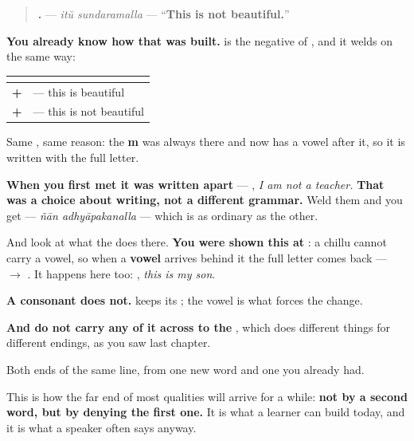 \begin{grammarlens}[title={Grammar Lens: the denial welds too}]
\begin{quote}
\textbf{ .} — \emph{itŭ sundaramalla} — \textquotedblleft{}\textbf{This is not beautiful.}\textquotedblright{}
\end{quote}

\textbf{You already know how that was built.} \textbf{} is the negative of \textbf{}, and it welds on the same way:

\noindent
\begin{tabularx}{\linewidth}{@{}>{\raggedright\arraybackslash}X>{\raggedright\arraybackslash}X@{}}
\toprule
\textbf{} & \textbf{} \\
\midrule
\textbf{\ml{സുന്ദരം} + \ml{ആണ്}} & \textbf{\ml{സുന്ദരമാണ്}} — this is beautiful \\
\textbf{\ml{സുന്ദരം} + \ml{അല്ല}} & \textbf{\ml{സുന്ദരമല്ല}} — this is not beautiful \\
\bottomrule
\end{tabularx}

Same \textbf{}, same reason: the \textbf{m} was always there and now has a vowel after it, so it is written with the full letter.

\textbf{When you first met  it was written apart} — \textbf{  }, \emph{I am not a teacher.} \textbf{That was a choice about writing, not a different grammar.} Weld them and you get \textbf{ } — \emph{ñān adhyāpakanalla} — which is as ordinary as the other.

And look at what the \textbf{} does there. \textbf{You were shown this at }: a chillu cannot carry a vowel, so when a \textbf{vowel} arrives behind it the full letter comes back — \textbf{ $\to$ }. It happens here too: \textbf{  }, \emph{this is my son}.

\textbf{A consonant does not.} \textbf{} keeps its \textbf{}; the vowel is what forces the change.

\textbf{And do not carry any of it across to the }, which does different things for different endings, as you saw last chapter.
\end{grammarlens}

\begin{grammarlens}[title={What you've built}]
Both ends of the same line, from one new word and one you already had.

This is how the far end of most qualities will arrive for a while: \textbf{not by a second word, but by denying the first one.} It is what a learner can build today, and it is what a speaker often says anyway.
\end{grammarlens}


